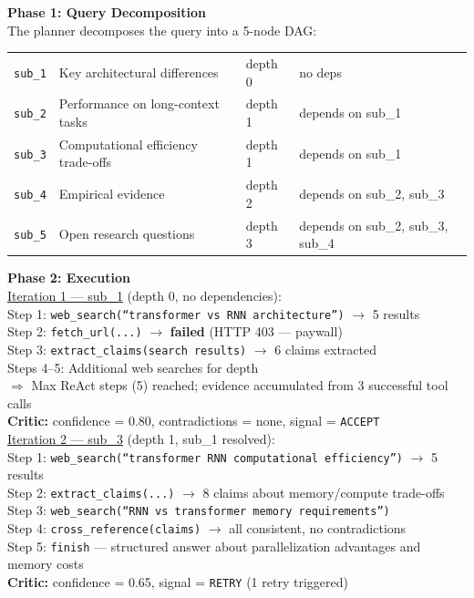 \documentclass[11pt]{article}
\begin{document}
\begin{tcolorbox}[boxstyle, title={Full Agent Trace --- q1}]
\small

\textbf{Phase 1: Query Decomposition} \\
The planner decomposes the query into a 5-node DAG: \\[2pt]
\begin{tabular}{@{}llll@{}}
\texttt{sub\_1} & Key architectural differences & depth 0 & no deps \\
\texttt{sub\_2} & Performance on long-context tasks & depth 1 & depends on sub\_1 \\
\texttt{sub\_3} & Computational efficiency trade-offs & depth 1 & depends on sub\_1 \\
\texttt{sub\_4} & Empirical evidence & depth 2 & depends on sub\_2, sub\_3 \\
\texttt{sub\_5} & Open research questions & depth 3 & depends on sub\_2, sub\_3, sub\_4 \\
\end{tabular}

\vspace{6pt}
\textbf{Phase 2: Execution} \\[4pt]

\underline{Iteration 1 --- sub\_1} (depth 0, no dependencies): \\
Step 1: \texttt{web\_search(``transformer vs RNN architecture'')} $\to$ 5 results \\
Step 2: \texttt{fetch\_url(...)} $\to$ \textbf{failed} (HTTP 403 --- paywall) \\
Step 3: \texttt{extract\_claims(search results)} $\to$ 6 claims extracted \\
Steps 4--5: Additional web searches for depth \\
$\Rightarrow$ Max ReAct steps (5) reached; evidence accumulated from 3 successful tool calls \\
\textbf{Critic:} confidence = 0.80, contradictions = none, signal = \texttt{ACCEPT} \\[4pt]

\underline{Iteration 2 --- sub\_3} (depth 1, sub\_1 resolved): \\
Step 1: \texttt{web\_search(``transformer RNN computational efficiency'')} $\to$ 5 results \\
Step 2: \texttt{extract\_claims(...)} $\to$ 8 claims about memory/compute trade-offs \\
Step 3: \texttt{web\_search(``RNN vs transformer memory requirements'')} \\
Step 4: \texttt{cross\_reference(claims)} $\to$ all consistent, no contradictions \\
Step 5: \texttt{finish} --- structured answer about parallelization advantages and memory costs \\
\textbf{Critic:} confidence = 0.65, signal = \texttt{RETRY} (1 retry triggered) \\[4pt]


\end{tcolorbox}
\end{document}
